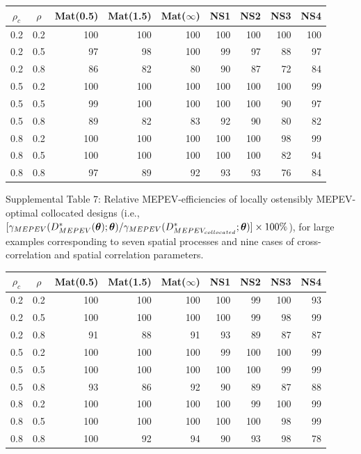 \documentclass[12pt]{article}
\def\btheta{\mbox{\boldmath$\theta$}}
\begin{document}
{\footnotesize
\vspace{.05in}
\begin{center}
\begin{tabular}{|cc|rrrrrrr|}
\hline
$\rho_c$ & $\rho$ & Mat(0.5) & Mat(1.5) & Mat($\infty$) & NS1 & NS2 & NS3 & NS4 \\
\hline
0.2 & 0.2 & 100 & 100 & 100 & 100 & 100 & 100 & 100\\
0.2 & 0.5 & 97  & 98  & 100 & 99  & 97  & 88  & 97\\
0.2 & 0.8 & 86  & 82  & 80  & 90  & 87  & 72  & 84\\
0.5 & 0.2 & 100 & 100 & 100 & 100 & 100 & 100 & 99\\
0.5 & 0.5 & 99  & 100 & 100 & 100 & 100 & 90  & 97\\
0.5 & 0.8 & 89  & 82  & 83  & 92  & 90  & 80  & 82\\
0.8 & 0.2 & 100 & 100 & 100 & 100 & 100 & 98  & 99\\
0.8 & 0.5 & 100 & 100 & 100 & 100 & 100 & 82  & 94\\
0.8 & 0.8 & 97  & 89  & 92  & 93  & 93  & 76 & 84\\
\hline
\end{tabular}
\end{center}}
\vspace{0.5in}
\noindent
Supplemental Table 7:  Relative MEPEV-efficiencies of locally ostensibly MEPEV-optimal collocated designs (i.e., $ [\gamma_{MEPEV}(D^{*}_{MEPEV}(\btheta);\btheta)/\gamma_{MEPEV}(D^{*}_{MEPEV_{collocated}};\btheta) ]\times 100\%$), for large examples corresponding to seven spatial processes and nine cases of cross-correlation and spatial correlation parameters.
{\footnotesize
\vspace{.05in}
\begin{center}
\begin{tabular}{|cc|rrrrrrr|}
\hline
$\rho_c$ & $\rho$ & Mat(0.5) & Mat(1.5) & Mat($\infty$) & NS1 & NS2 & NS3 & NS4\\
\hline
0.2 & 0.2 & 100 & 100 & 100 & 100 & 99  & 100 & 93\\
0.2 & 0.5 & 100 & 100 & 100 & 100 & 99  & 98 & 99\\
0.2 & 0.8 & 91  & 88  & 91  & 93  & 89  & 87 & 87\\
0.5 & 0.2 & 100 & 100 & 100 & 99  & 100 & 100 & 99\\
0.5 & 0.5 & 100 & 100 & 100 & 100 & 100 & 99 & 99\\
0.5 & 0.8 & 93  & 86  & 92  & 90  & 89  & 87 & 88\\
0.8 & 0.2 & 100 & 100 & 100 & 100 & 99  & 100 & 99\\
0.8 & 0.5 & 100 & 100 & 100 & 100 & 100 & 98 & 99\\
0.8 & 0.8 & 100 & 92  & 94  & 90  & 93  & 98 & 78\\
\hline
\end{tabular}
\end{center}}
\end{document}
